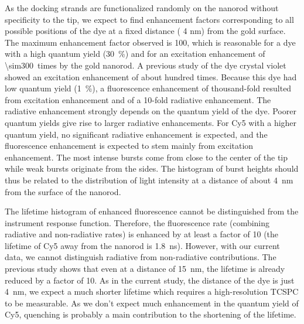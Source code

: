 As the docking strands are functionalized randomly on the nanorod without specificity to the tip, we expect to find enhancement factors corresponding to all possible positions of the dye at a fixed distance ( 4 nm) from the gold surface.
The maximum enhancement factor observed is 100, which is reasonable for a dye with a high quantum yield (\SI{30}{\percent}) and for an excitation enhancement of \SI{\sim300}{times} by the gold nanorod.
A previous study of the dye crystal violet showed an excitation enhancement of about hundred times. Because this dye had low quantum yield (\SI{1}{\percent}), a fluorescence enhancement of thousand-fold resulted from excitation enhancement and of a 10-fold radiative enhancement. The radiative enhancement strongly depends on the quantum yield of the dye. Poorer quantum yields give rise to larger radiative enhancements. For Cy5 with a higher quantum yield, no significant radiative enhancement is expected, and the fluorescence enhancement is expected to stem mainly from excitation enhancement.
The most intense bursts come from close to the center of the tip while weak bursts originate from the sides.
The histogram of burst heights should thus be related to the distribution of light intensity at a distance of about \SI{4}{\nm} from the surface of the nanorod.

The lifetime histogram of enhanced fluorescence cannot be distinguished from the instrument response function. Therefore, the fluorescence rate (combining radiative and non-radiative rates) is enhanced by at least a factor of 10 (the lifetime of Cy5 away from the nanorod is \SI{1.8}{\ns}). However, with our current data, we cannot distinguish radiative from non-radiative contributions.
The previous study\cite{seelig2007nanoparticleinduced} shows that even at a distance of \SI{15}{\nm}, the lifetime is already reduced by a factor of 10.
As in the current study, the distance of the dye is just \SI{4}{\nm}, we expect a much shorter lifetime which requires a high-resolution TCSPC to be measurable.
As we don't expect much enhancement in the quantum yield of Cy5, quenching is probably a main contribution to the shortening of the lifetime.

